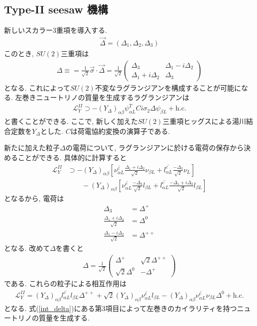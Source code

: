 \subsection{Type-II seesaw 機構}
新しいスカラー3重項を導入する.
\begin{align}
  \vec{\Delta} = (\Delta_1, \Delta_2, \Delta_3) \nonumber
\end{align}
このとき, $SU(2)$三重項は
\begin{align}
  \Delta \equiv = \frac{1}{\sqrt{2}}\vec{\sigma}\cdot\vec{\Delta} = \frac{1}{\sqrt{2}}
  \begin{pmatrix}
    \Delta_3 & \Delta_1 -i\Delta_2 \\
    \Delta_1 +i\Delta_2 & \Delta_3
  \end{pmatrix}\nonumber
\end{align}
となる.
これによって$SU(2)$不変なラグランジアンを構成することが可能になる.
左巻きニュートリノの質量を生成するラグランジアンは
\begin{align}
  \mathcal{L}_Y^{II} \supset -(Y_\Delta)_{\alpha\beta} \psi_{\alpha L}^T C i\sigma_2 \Delta \psi_{\beta L} + \mathrm{h.c.}
\end{align}
と書くことができる.
ここで, 新しく加えた$SU(2)$三重項ヒッグスによる湯川結合定数を$Y_\Delta$とした.
$C$は荷電協約変換の演算子である.

新たに加えた粒子$\Delta$の電荷について, ラグランジアンに於ける電荷の保存から決めることができる.
具体的に計算すると
\begin{align}
  \mathcal{L}_Y^{II} &\supset -(Y_\Delta)_{\alpha\beta}\left[ \overline{\nu_{\alpha L}^c}\frac{\Delta_1 + i\Delta_2}{\sqrt{2}}\nu_{\beta L} + \overline{l_{\alpha L}^c}\frac{-\Delta_3}{\sqrt{2}}\nu_L \right]\nonumber\\
  &\qquad-(Y_\Delta)_{\alpha\beta}\left[ \overline{\nu_{\alpha L}^c}\frac{-\Delta_3}{\sqrt{2}}l_{\beta L} + \overline{l_{\alpha L}^c}\frac{-\Delta_1 + i\Delta_2}{\sqrt{2}}l_{\beta L} \right]
\end{align}
となるから, 電荷は
\begin{align}
  \Delta_3 &= \Delta^+ \nonumber\\
  \frac{\Delta_1 +i\Delta_2}{\sqrt{2}} &= \Delta^0\nonumber\\
  \frac{\Delta_1 -i\Delta_2}{\sqrt{2}} &= \Delta^{++}\nonumber
\end{align}
となる.
改めて$\Delta$を書くと
\begin{align}
  \Delta = \frac{1}{\sqrt{2}}\begin{pmatrix}
    \Delta^+ & \sqrt{2}\Delta^{++} \\
    \sqrt{2}\Delta^0 & -\Delta^{+}
  \end{pmatrix}\nonumber
\end{align}
である.
これらの粒子による相互作用は
\begin{align}
  \mathcal{L}_Y^{II} = (Y_\Delta)_{\alpha\beta}\overline{l_{\alpha L}^c} l_{\beta L} \Delta^{++} + \sqrt{2}(Y_\Delta)_{\alpha\beta} \overline{\nu_{\alpha L}^c} l_{\beta L} -(Y_\Delta)_{\alpha\beta} \overline{\nu_{\alpha L}^c} \nu_{\beta L} \Delta^0 + \mathrm{h.c.} \label{int_delta}
\end{align}
となる.
式(\ref{int_delta})にある第3項目によって左巻きのカイラリティを持つニュートリノの質量を生成する.

